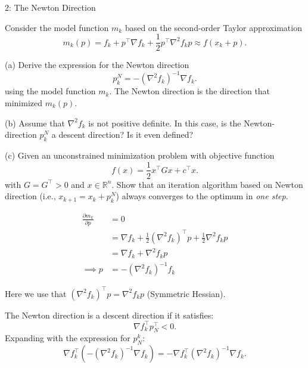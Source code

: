 
\begin{problem}{2: The Newton Direction}

Consider the model function $m_k$ based on the second-order Taylor approximation
\[
  m_k(p) = f_k + p^{\top} \nabla f_k + \frac{1}{2}p^{\top}\nabla ^2 f_k p \approx f(x_k + p)
  .\]

\medskip (a) Derive the expression for the Newton direction
\[
  p_k^{N} = -(\nabla ^2 f_k)^{-1} \nabla f_k
  .\]
using the model function $m_k$. The Newton direction is the direction that minimized $m_k(p)$.

\medskip (b) Assume that $\nabla ^2 f_k$ is not positive definite. In this case, is the Newton-direction $p_k^{N}$ a descent direction? Is it even defined?

\medskip (c) Given an unconstrained minimization problem with objective function
\[
  f(x) = \frac{1}{2}x^{\top}Gx + c^{\top}x
  .\]
with $G = G^{\top} > 0$ and $x  \in \mathbb{R}^{n}$. Show that an iteration algorithm based on Newton direction (i.e., $x_{k+1} = x_k + p_k^{N}$) always converges to the optimum in \textit{one step}.

\end{problem}



\begin{align*}
  \frac{\partial m_k}{\partial p} & = 0                                                                             \\
                                  & = \nabla f_k + \frac{1}{2}(\nabla ^2 f_k)^{\top}p + \frac{1}{2} \nabla ^2 f_k p \\
                                  & =\nabla f_k + \nabla ^2 f_k p                                                   \\
  \implies p                      & = -(\nabla ^2 f_k)^{-1} f_k
\end{align*}

Here we use that $(\nabla ^2 f_k)^{\top}p = \nabla ^2 f_k p$ (Symmetric Hessian).


The Newton direction is a descent direction if it satisfies:
\[
  \nabla f_k^{\top}p_N^{\top} < 0
  .\]
Expanding with the expression for $p_N^{k}$:
\[
  \nabla f_k^{\top}(-(\nabla ^2f_k)^{-1}\nabla f_k) = -\nabla f_k^{\top}(\nabla ^2 f_k)^{-1}\nabla f_k
  .\]

